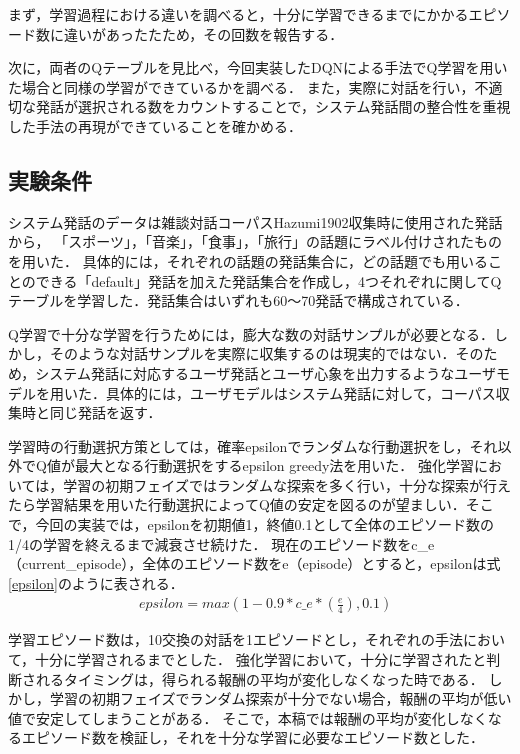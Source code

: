 \documentclass[a4j,dvipdfmx]{jarticle}
\begin{document}
まず，学習過程における違いを調べると，十分に学習できるまでにかかるエピソード数に違いがあったたため，その回数を報告する．

次に，両者のQテーブルを見比べ，今回実装したDQNによる手法でQ学習を用いた場合と同様の学習ができているかを調べる．
また，実際に対話を行い，不適切な発話が選択される数をカウントすることで，システム発話間の整合性を重視した手法の再現ができていることを確かめる．



\subsection{実験条件}
システム発話のデータは雑談対話コーパスHazumi1902\cite{Hazumi}収集時に使用された発話から，
「スポーツ」，「音楽」，「食事」，「旅行」の話題にラベル付けされたものを用いた．
具体的には，それぞれの話題の発話集合に，どの話題でも用いることのできる「default」発話を加えた発話集合を作成し，4つそれぞれに関してQテーブルを学習した．発話集合はいずれも60〜70発話で構成されている．

Q学習で十分な学習を行うためには，膨大な数の対話サンプルが必要となる．しかし，そのような対話サンプルを実際に収集するのは現実的ではない．そのため，システム発話に対応するユーザ発話とユーザ心象を出力するようなユーザモデルを用いた．具体的には，ユーザモデルはシステム発話に対して，コーパス収集時と同じ発話を返す．

学習時の行動選択方策としては，確率epsilonでランダムな行動選択をし，それ以外でQ値が最大となる行動選択をするepsilon greedy法を用いた．
強化学習においては，学習の初期フェイズではランダムな探索を多く行い，十分な探索が行えたら学習結果を用いた行動選択によってQ値の安定を図るのが望ましい．そこで，今回の実装では，epsilonを初期値1，終値0.1として全体のエピソード数の1/4の学習を終えるまで減衰させ続けた．
現在のエピソード数をc\_e（current\_episode），全体のエピソード数をe（episode）とすると，epsilonは式\ref{epsilon}のように表される．
\begin{equation}\label{epsilon}\begin{split}&epsilon=max(1-0.9*c\_e*(\frac{e}{4}),0.1)\end{split}\end{equation}

学習エピソード数は，10交換の対話を1エピソードとし，それぞれの手法において，十分に学習されるまでとした．
強化学習において，十分に学習されたと判断されるタイミングは，得られる報酬の平均が変化しなくなった時である．
しかし，学習の初期フェイズでランダム探索が十分でない場合，報酬の平均が低い値で安定してしまうことがある．
そこで，本稿では報酬の平均が変化しなくなるエピソード数を検証し，それを十分な学習に必要なエピソード数とした．
\end{document}

